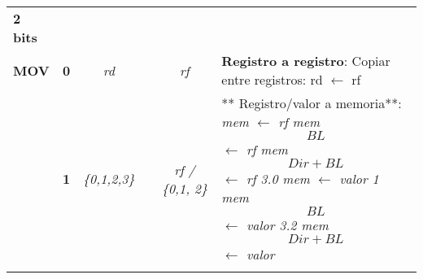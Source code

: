 \documentclass[12pt,twoside]{templates/unerthesis}
\begin{document}
\begin{longtable}[]{@{}lccccl@{}}
\begin{minipage}[t]{0.14\columnwidth}
\textbf{2 bits}\strut
\end{minipage} & \begin{minipage}[t]{0.14\columnwidth}\raggedright
\strut
\end{minipage}\tabularnewline
\begin{minipage}[t]{0.14\columnwidth}\raggedright
\textbf{MOV}\strut
\end{minipage} & \begin{minipage}[t]{0.14\columnwidth}\centering
\textbf{0}\strut
\end{minipage} & \begin{minipage}[t]{0.14\columnwidth}\centering
\emph{rd}\strut
\end{minipage} & \begin{minipage}[t]{0.14\columnwidth}\centering
\strut
\end{minipage} & \begin{minipage}[t]{0.14\columnwidth}\centering
\emph{rf}\strut
\end{minipage} & \begin{minipage}[t]{0.14\columnwidth}\raggedright
\textbf{Registro a registro}: Copiar entre registros: rd \(\leftarrow\) rf\strut
\end{minipage}\tabularnewline
\begin{minipage}[t]{0.14\columnwidth}\raggedright
\strut
\end{minipage} & \begin{minipage}[t]{0.14\columnwidth}\centering
\textbf{1}\strut
\end{minipage} & \begin{minipage}[t]{0.14\columnwidth}\centering
\emph{\{0,1,2,3\}}\strut
\end{minipage} & \begin{minipage}[t]{0.14\columnwidth}\centering
\strut
\end{minipage} & \begin{minipage}[t]{0.14\columnwidth}\centering
\emph{rf / \{0,1, 2\}}\strut
\end{minipage} & \begin{minipage}[t]{0.14\columnwidth}\raggedright
** Registro/valor a memoria**: \emph{mem \(\leftarrow\) rf mem\[BL\] \(\leftarrow\) rf mem\[Dir + BL\] \(\leftarrow\) rf 3.0 mem \(\leftarrow\) valor 1 mem\[BL\] \(\leftarrow\) valor 3.2 mem\[Dir + BL\] \(\leftarrow\) valor}\strut
\end{minipage}\tabularnewline
\begin{minipage}[t]{0.14\columnwidth}\raggedright
\strut
\end{minipage} & \begin{minipage}[t]{0.14\columnwidth}\centering

\end{minipage}
\end{longtable}
\end{document}
